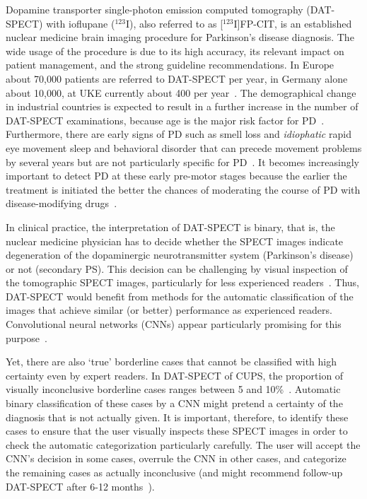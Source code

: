 Dopamine transporter single-photon emission computed tomography (DAT-SPECT) 
with ioflupane ($^{123}$I), also referred to as [$^{123}$I]FP-CIT, is an established nuclear medicine brain imaging procedure for Parkinson's disease diagnosis.
The wide usage of the procedure is due to its high accuracy, its relevant impact on patient management, 
and the strong guideline recommendations.
In Europe about 70,000 patients are referred to DAT-SPECT per year, in Germany alone about 10,000, at UKE currently about 400 per year~\citep{Marienhagen2017}.
The demographical change in industrial countries is expected to result in a further increase in the number of DAT-SPECT examinations, 
because age is the major risk factor for PD~\citep{Reeve2014}.
Furthermore, there are early signs of PD such as smell loss and \textit{idiophatic} rapid eye movement sleep and behavioral disorder 
that can precede movement problems by several years but are not particularly specific for PD~\citep{Iranzo2017, Postuma2019may, Postuma2019mar}.
It becomes increasingly important to detect PD at these early pre-motor stages because the earlier the treatment is initiated the better 
the chances of moderating the course of PD with disease-modifying drugs~\citep{Kim2017}.


In clinical practice, the interpretation of DAT-SPECT is binary, that is, the nuclear medicine physician has to decide whether the SPECT images 
indicate degeneration of the dopaminergic neurotransmitter system (Parkinson's disease) or not (secondary PS). 
This decision can be challenging by visual inspection of the tomographic SPECT images, particularly for less experienced readers~\citep{Schiebler2023}.
Thus, DAT-SPECT would benefit from methods for the automatic classification of the images that achieve similar (or better) performance as experienced readers. 
Convolutional neural networks (CNNs) appear particularly promising for this purpose~\citep{Wenzel2019, Chien2020, Magesh2020, Hathaliya2022, Nazari2022}.


Yet, there are also `true' borderline cases that cannot be classified with high certainty even by expert readers. 
In DAT-SPECT of CUPS, the proportion of visually inconclusive borderline cases ranges between 5 and 10\%~\citep{Makinen2016, Albert2016}.
Automatic binary classification of these cases by a CNN might pretend a certainty of the diagnosis that is not actually given. 
It is important, therefore, to identify these cases to ensure that the user visually inspects these SPECT images 
in order to check the automatic categorization particularly carefully. 
The user will accept the CNN's decision in some cases, overrule the CNN in other cases, and categorize the remaining cases as 
actually inconclusive (and might recommend follow-up DAT-SPECT after 6-12 months~\citep{Apostolova2017}).

